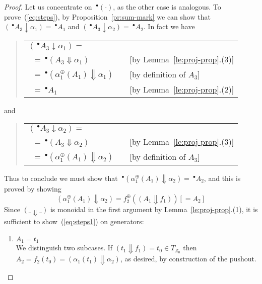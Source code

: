 \documentclass{LMCS}
\newcommand{\monSub}[2]{\ensuremath{{#1}_{#2}^\oplus}}
\newcommand{\res}[2]{\ensuremath{({#1}\!\downarrow\!{#2})}}
\newcommand{\sres}[2]{\ensuremath{({#1}\!\Downarrow\!{#2})}}
\newcommand{\pre}[1][(\cdot)]{\ensuremath{\!~^\bullet{#1}}}
\begin{document}
\begin{proof}
  Let us concentrate on $\pre$, as the other case is analogous.
  To prove~(\ref{eq:steps}), by Proposition~\ref{pr:sum-mark} we can
  show that $\res{\pre[A_3]}{\alpha_1} = \pre[A_1]$ and
  $\res{\pre[A_3]}{\alpha_2} = \pre[A_2]$. In fact we have 
  \begin{quote}
    \begin{tabular}{lll}
      $\res{\pre[A_3]}{\alpha_1} =$ & \quad & 
      \\
\ \quad $= \pre[\sres{A_3}{\alpha_1}]$ & \quad & 
      [by Lemma~\ref{le:proj-prop}.(3)]\\ 
\ \quad $= \pre[\sres{\monSub{\alpha}{1}(A_1)}{\alpha_1}]$ & \quad & 
      [by definition of $A_3$]\\ 
\ \quad $= \pre[A_1]$ & & [by Lemma~\ref{le:proj-prop}.(2)]
    \end{tabular}
  \end{quote}
  and
  \begin{quote}
    \begin{tabular}{lll}
      $\res{\pre[A_3]}{\alpha_2} =$ & \quad & 
      \\
\ \quad $= \pre[\sres{A_3}{\alpha_2}]$ & \quad & 
      [by Lemma~\ref{le:proj-prop}.(3)]\\ 
\ \quad $= \pre[\sres{\monSub{\alpha}{1}(A_1)}{\alpha_2}]$ & &
      [by definition of $A_3$]
    \end{tabular}
  \end{quote}
  Thus to conclude we must show that $\pre[\sres{\monSub{\alpha}{1}(A_1)}{\alpha_2}] =
  \pre[A_2]$, and this is proved by showing
  \begin{equation}
    \label{eq:steps1}
    \sres{\monSub{\alpha}{1}(A_1)}{\alpha_2} = 
    \monSub{f}{2}(\sres{A_1}{f_1}) [ = A_2]
  \end{equation}
  Since $\sres{\_}{\_}$ is monoidal in the first argument by
  Lemma~\ref{le:proj-prop}.(1), it is sufficient to
  show~(\ref{eq:steps1}) on generators: 



  \begin{enumerate}[$\bullet$]





    \medskip

  \item $A_1 = t_1$\\
    We distinguish two subcases. If $\sres{t_1}{f_1} = t_0 \in T_{Z_0}$ then
    $A_2 = f_2(t_0) = \sres{\alpha_1(t_1)}{\alpha_2}$, as desired, by
    construction of the pushout.


\end{enumerate}
\end{proof}
\end{document}
